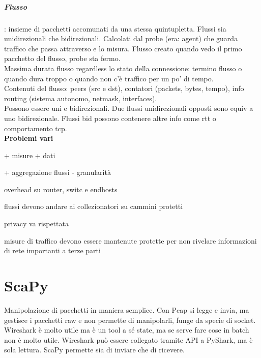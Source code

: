 \documentclass[10pt]{book}
\begin{document}
\paragraph{Flusso}: insieme di pacchetti accomunati da una stessa quintupletta. Flussi sia unidirezionali che bidirezionali. Calcolati dal probe (era: agent) che guarda traffico che passa attraverso e lo misura. Flusso creato quando vedo il primo pacchetto del flusso, probe sta fermo.\\
Massima durata flusso regardless lo stato della connessione: termino flusso o quando dura troppo o quando non c'è traffico per un po' di tempo.\\
Contenuti del flusso: peers (src e dst), contatori (packets, bytes, tempo), info routing (sistema autonomo, netmask, interfaces).\\
Possono essere uni e bidirezionali. Due flussi unidirezionali opposti sono equiv a uno bidirezionale. Flussi bid possono contenere altre info come rtt o comportamento tcp.\\
\textbf{Problemi vari}\\
\begin{list}{}{Overhead vs accuratezza}
	\item + misure + dati
	\item + aggregazione flussi - granularità
	\item overhead su router, switc e endhosts
\end{list}
\begin{list}{}{Security vs data sharing}
	\item flussi devono andare ai collezionatori su cammini protetti
	\item privacy va rispettata
	\item misure di traffico devono essere mantenute protette per non rivelare informazioni di rete importanti a terze parti
\end{list}

\chapter{ScaPy}
Manipolazione di pacchetti in maniera semplice. Con Pcap si legge e invia, ma gestisce i pacchetti raw e non permette di manipolarli, funge da specie di socket. Wireshark è molto utile ma è un tool a sé state, ma se serve fare cose in batch non è molto utile. Wireshark può essere collegato tramite API a PyShark, ma è sola lettura. ScaPy permette sia di inviare che di ricevere.
\end{document}
